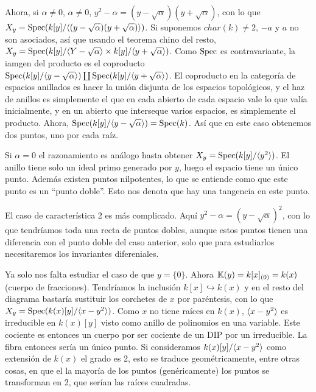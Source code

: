 \documentclass[GA.tex]{subfiles}
\begin{document}
\begin{ej}
 Ahora, si $\alpha\neq 0$, $\alpha\neq 0$, $y^2-\alpha=(y-\sqrt{\alpha})(y+\sqrt{\alpha})$, con lo que $X_y=\operatorname{Spec}(k[y]/\langle{(y-\sqrt{\alpha})(y+\sqrt{\alpha})}\rangle)$. Si suponemos $char(k)\neq 2$, $-a$ y $a$ no son asociados, así que usando el teorema chino del resto, $X_y=\operatorname{Spec}(k[y]/\langle{Y-\sqrt{\alpha}}\rangle\times k[y]/\langle{y+\sqrt{\alpha}}\rangle)$. Como $\operatorname{Spec}$ es contravariante, la iamgen del producto es el coproducto $\operatorname{Spec}(k[y]/\langle{y-\sqrt{\alpha}}\rangle)\coprod \operatorname{Spec}(k[y]/\langle{y+\sqrt{\alpha}}\rangle)$. El coproducto en la categoría de espacios anillados es hacer la unión disjunta de los espacios topológicos, y el haz de anillos es simplemente el que en cada abierto de cada espacio vale lo que valía inicialmente, y en un abierto que interseque varios espacios, es simplemente el producto. Ahora, $\operatorname{Spec}(k[y]/\langle{y-\sqrt{\alpha}}\rangle)=\operatorname{Spec}(k)$. Así que en este caso obtenemos dos puntos, uno por cada raíz. 
 
Si $\alpha=0$ el razonamiento es análogo hasta obtener $X_y=\operatorname{Spec}(k[y]/\langle{y^2}\rangle)$. El anillo tiene solo un ideal primo generado por $y$, luego el espacio tiene un único punto. Además existen puntos nilpotentes, lo que se entiende como que este punto es un ``punto doble''. Esto nos denota que hay una tangencia en este punto. 

El caso de característica 2 es más complicado. Aquí $y^2-\alpha=(y-\sqrt{\alpha})^2$, con lo que tendríamos toda una recta de puntos dobles, aunque estos puntos tienen una diferencia con el punto doble del caso anterior, solo que para estudiarlos necesitaremos los invariantes difereniales.

Ya solo nos falta estudiar el caso de que $y=\{0\}$. Ahora $\mathbb{K}(y)=k[x]_{(0)}=k(x)$ (cuerpo de fracciones). Tendríamos la inclusión $k[x]\hookrightarrow k(x)$ y en el resto del diagrama bastaría sustituir los corchetes de $x$ por paréntesis, con lo que $X_y=\operatorname{Spec}(k(x)[y]/\langle{x-y^2}\rangle)$. Como $x$ no tiene raíces en $k(x)$, $\langle{x-y^2}\rangle$ es irreducible en $k(x)[y]$ visto como anillo de polinomios en una variable. Este cociente es entonces un cuerpo por ser cociente de un DIP por un irreducible. La fibra entonces sería un único punto. Si consideramos $k(x)[y]/\langle{x-y^2}\rangle$ como extensión de $k(x)$ el grado es 2, esto se traduce geométricamente, entre otras cosas, en que el la mayoría de los puntos (genéricamente) los puntos se transforman en 2, que serían las raíces cuadradas.
\end{ej}
\end{document}
